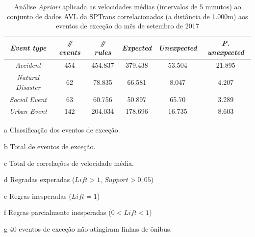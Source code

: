 \documentclass[
	12pt,				%
	oneside,			%
	a4paper,			%
	english,			%
	brazil				%
	]{abntex2ppgsi}
\begin{document}
{{\begin{apendicesenv}
\begin{table}[!htb]
\centering
\begin{threeparttable}
\caption {Análise \textit{Apriori} aplicada as velocidades médias (intervalos de 5 minutos) ao conjunto de dados AVL da SPTrans correlacionados (a distância de 1.000m) aos eventos de exceção do mês de setembro de 2017}
\label {tab:aprioriFull}
\begin{tabular}{c|c|c|c|c|c}
\hline
\textbf{\textit{Event type}}\tnote{a} & \textbf{\textit{\# events}}\tnote{b} & \textit{\textbf{\# rules}}\tnote{c} & \textbf{\textit{Expected}}\tnote{d} & \textbf{\textit{Unexpected}}\tnote{e} & \textbf{\textit{P. unexpected}}\tnote{f}   \\
\hline
\textit{Accident} & 454 & 454.837 & 379.438 & 53.504 & 21.895 \\
\textit{Natural Disaster} & 62 & 78.835 & 66.581 & 8.047 & 4.207 \\
\textit{Social Event} & 63 & 60.756 & 50.897 & 65.70 & 3.289 \\
\textit{Urban Event} & 142 & 204.034 & 178.696 & 16.735 & 8.603 \\
\hline
\end{tabular}
\begin{tablenotes}
            \item[a] Classificação dos eventos de exceção.
            \item[b] Total de eventos de exceção.
            \item[c] Total de correlações de velocidade média.
            \item[d] Regradas experadas ($Lift > 1$, $Support > 0,05$)
            \item[e] Regras inesperadas ($Lift = 1$)
            \item[f] Regras parcialmente inesperadas ($0 < Lift < 1$)
            \item[g] 40 eventos de exceção não atingiram linhas de ônibus.
        \end{tablenotes}
\end{threeparttable}
\end{table}


\end{apendicesenv}}}
\end{document}
